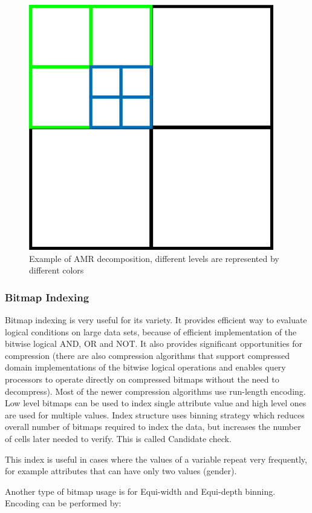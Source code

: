 \begin{figure}
\centering
\includegraphics[scale=0.5]{amr_obr.png}
\caption{Example of AMR decomposition, different levels are represented by different colors}
\end{figure}


\subsubsection{Bitmap Indexing}
Bitmap indexing is very useful for its variety. It provides efficient way to evaluate logical conditions on large data sets, because of efficient implementation of the bitwise logical AND, OR and NOT. It also provides significant opportunities for compression (there are also compression algorithms that support compressed domain implementations of the bitwise logical operations and enables query processors to operate directly on compressed bitmaps without the need to decompress). Most of the newer compression algorithms use run-length encoding. Low level bitmaps can be used to index single attribute value and high level ones are used for multiple values. Index structure uses binning strategy which reduces overall number of bitmaps required to index the data, but increases the number of cells later needed to verify. This is called Candidate check. 

This index is useful in cases where the values of a variable repeat very frequently, for example attributes that can have only two values (gender).

Another type of bitmap usage is for Equi-width and Equi-depth binning. Encoding can be performed by:

